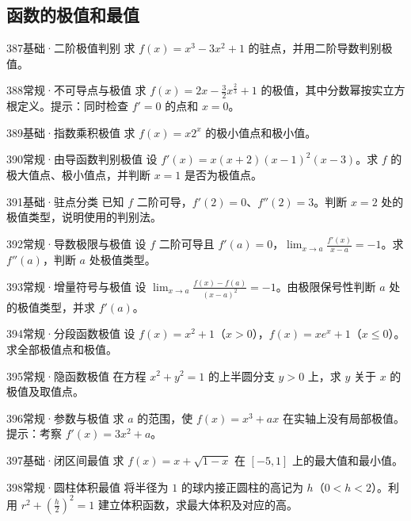 \subsection{函数的极值和最值}
\begin{exercise}{387}{基础·二阶极值判别}
求 $f(x)=x^3-3x^2+1$ 的驻点，并用二阶导数判别极值。
\end{exercise}
\begin{exercise}{388}{常规·不可导点与极值}
求 $f(x)=2x-\frac32x^{\frac{2}{3}}+1$ 的极值，其中分数幂按实立方根定义。提示：同时检查 $f'=0$ 的点和 $x=0$。
\end{exercise}
\begin{exercise}{389}{基础·指数乘积极值}
求 $f(x)=x2^x$ 的极小值点和极小值。
\end{exercise}
\begin{exercise}{390}{常规·由导函数判别极值}
设 $f'(x)=x(x+2)(x-1)^2(x-3)$。求 $f$ 的极大值点、极小值点，并判断 $x=1$ 是否为极值点。
\end{exercise}
\begin{exercise}{391}{基础·驻点分类}
已知 $f$ 二阶可导，$f'(2)=0$、$f''(2)=3$。判断 $x=2$ 处的极值类型，说明使用的判别法。
\end{exercise}
\begin{exercise}{392}{常规·导数极限与极值}
设 $f$ 二阶可导且 $f'(a)=0$，$\lim_{x\to a}\frac{f'(x)}{x-a}=-1$。求 $f''(a)$，判断 $a$ 处极值类型。
\end{exercise}
\begin{exercise}{393}{常规·增量符号与极值}
设 $\lim_{x\to a}\frac{f(x)-f(a)}{(x-a)^2}=-1$。由极限保号性判断 $a$ 处的极值类型，并求 $f'(a)$。
\end{exercise}
\begin{exercise}{394}{常规·分段函数极值}
设 $f(x)=x^2+1$（$x>0$），$f(x)=xe^x+1$（$x\le0$）。求全部极值点和极值。
\end{exercise}
\begin{exercise}{395}{常规·隐函数极值}
在方程 $x^2+y^2=1$ 的上半圆分支 $y>0$ 上，求 $y$ 关于 $x$ 的极值及取值点。
\end{exercise}
\begin{exercise}{396}{常规·参数与极值}
求 $a$ 的范围，使 $f(x)=x^3+ax$ 在实轴上没有局部极值。提示：考察 $f'(x)=3x^2+a$。
\end{exercise}
\begin{exercise}{397}{基础·闭区间最值}
求 $f(x)=x+\sqrt{1-x}$ 在 $[-5,1]$ 上的最大值和最小值。
\end{exercise}
\begin{exercise}{398}{常规·圆柱体积最值}
将半径为 $1$ 的球内接正圆柱的高记为 $h$（$0<h<2$）。利用 $r^2+(\frac{h}{2})^2=1$ 建立体积函数，求最大体积及对应的高。
\end{exercise}
